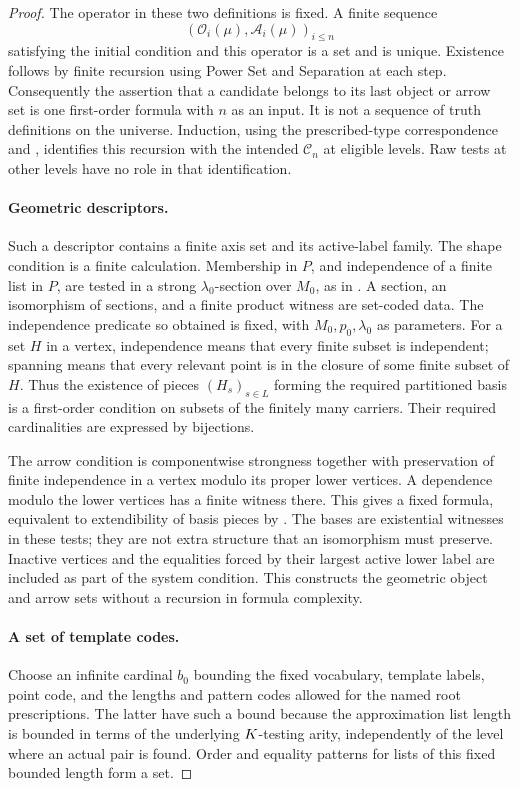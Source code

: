 \begin{proof}
The operator in these two definitions is fixed.  A finite sequence
\[
 (\mathcal O_i(\mu),\mathcal A_i(\mu))_{i\le n}
\]
satisfying the initial condition and this operator is a set and is
unique.  Existence follows by finite recursion using Power Set and
Separation at each step.  Consequently the assertion that a candidate
belongs to its last object or arrow set is one first-order formula with
$n$ as an input.  It is not a sequence of truth definitions on the
universe.  Induction, using the prescribed-type correspondence and
, identifies this recursion with the intended
$\mathcal C_n$ at eligible levels.  Raw tests at other levels have no role
in that identification.

\paragraph{Geometric descriptors.}
Such a descriptor contains a finite axis set and its active-label family.
The shape condition is a finite calculation.  Membership in $P$, and
independence of a finite list in $P$, are tested in a strong
$\lambda_0$-section over $M_0$, as in
.  A section, an isomorphism of sections,
and a finite product witness are set-coded data.  The independence
predicate so obtained is fixed, with $M_0,p_0,\lambda_0$ as parameters.
For a set $H$ in a vertex, independence means that every finite subset
is independent; spanning means that every relevant point is in the
closure of some finite subset of $H$.  Thus the existence of pieces
$(H_s)_{s\in L}$ forming the required partitioned basis is a first-order
condition on subsets of the finitely many carriers.  Their required
cardinalities are expressed by bijections.

The arrow condition is componentwise strongness together with
preservation of finite independence in a vertex modulo its proper lower
vertices.  A dependence modulo the lower vertices has a finite witness
there.  This gives a fixed formula, equivalent to extendibility of basis
pieces by .  The bases are existential witnesses
in these tests; they are not extra structure that an isomorphism must
preserve.  Inactive vertices and the equalities forced by their largest
active lower label are included as part of the system condition.  This
constructs the geometric object and arrow sets without a recursion in
formula complexity.

\paragraph{A set of template codes.}
Choose an infinite cardinal $b_0$ bounding the fixed vocabulary, template
labels, point code, and the lengths and pattern codes allowed for the
named root prescriptions.  The latter have such a bound because the
approximation list length is bounded in terms of the underlying
$K$-testing arity, independently of the level where an actual pair is
found.  Order and equality patterns for lists of this fixed bounded
length form a set.


\end{proof}
